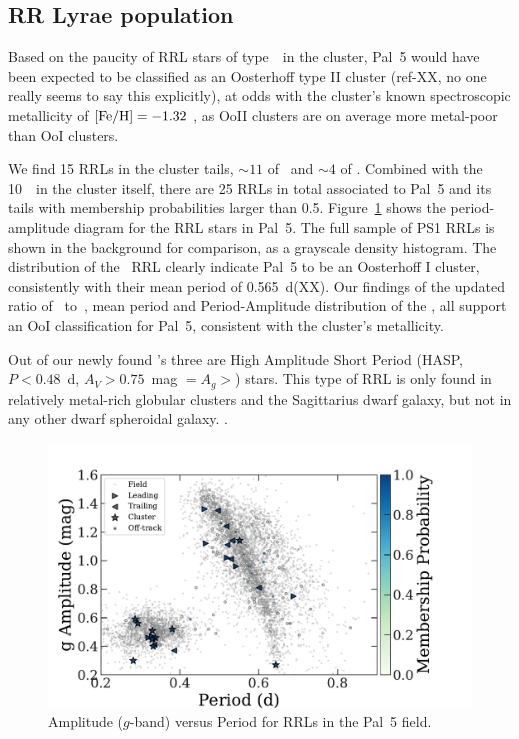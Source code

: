 \documentclass[twocolumn]{aastex63}
\begin{document}
\subsection{RR Lyrae population }

Based on the paucity of RRL stars of type~\typeab~in the cluster, Pal~5  would have been expected to be classified as an Oosterhoff type II cluster (ref-XX, no one really seems to say this explicitly), at odds with the cluster's known spectroscopic metallicity of $[\mathrm{Fe}/\mathrm{H}]=-1.32$ \citep{Kuijsen2018}, as OoII clusters are on average more metal-poor than OoI clusters.

We find 15 RRLs in the cluster tails, $\sim11$ of \typeab\ and $\sim4$ of \typec. Combined with the 10~\rrc~in the cluster itself, there are 25 RRLs in total associated to Pal~5 and its tails with membership probabilities larger than 0.5. Figure~\ref{fig:PA_diagram} shows the period-amplitude diagram for the RRL stars in Pal~5. The full sample of PS1 RRLs is shown in the background for comparison, as a grayscale density histogram. The distribution of the \typeab~RRL clearly indicate Pal~5 to be an Oosterhoff I cluster, consistently with their mean period of 0.565~d(XX).  Our findings of the updated ratio of \rrab~to~\rrc, mean period and Period-Amplitude distribution of the \rrab, all support an OoI classification for Pal~5, consistent with the cluster's metallicity.

Out of our newly found \rrab's three are High Amplitude Short Period (HASP, $P <0.48$~d, $A_V>0.75$~mag $=A_g>$) stars. This type of RRL is only found in relatively metal-rich globular clusters  \citep[$\FeH>-1.5$][]{Monelli2017} and the Sagittarius dwarf galaxy, but not in any other dwarf spheroidal galaxy. .


\begin{figure}
\begin{center}
\includegraphics[width=\columnwidth]{rrls_PA.pdf}
\caption{Amplitude ($g$-band) versus Period for RRLs in the Pal~5 field.}\label{fig:PA_diagram}
\end{center}
\end{figure}
\end{document}
